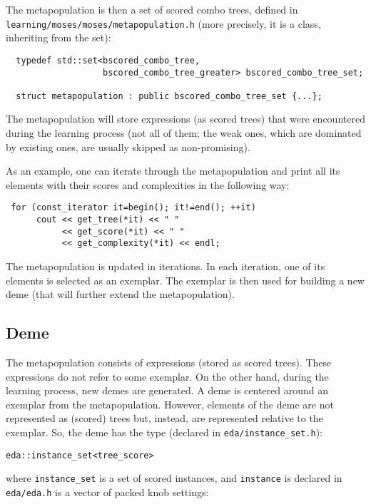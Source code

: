 \documentclass{article}
\begin{document}
The metapopulation is then a set of scored combo trees, defined in 
\verb|learning/moses/moses/metapopulation.h| (more precisely, it is a
class, inheriting from the set):

\begin{verbatim}
  typedef std::set<bscored_combo_tree,
                   bscored_combo_tree_greater> bscored_combo_tree_set;

  struct metapopulation : public bscored_combo_tree_set {...};
\end{verbatim}

The metapopulation will store expressions (as scored trees) that were
encountered during the learning process (not all of them; the weak
ones, which are dominated by existing ones, are usually skipped as
non-promising). 

As an example, one can iterate through the metapopulation and print 
all its elements with their scores and complexities in the following way:

\begin{verbatim}
 for (const_iterator it=begin(); it!=end(); ++it)
      cout << get_tree(*it) << " " 
           << get_score(*it) << " " 
           << get_complexity(*it) << endl;
\end{verbatim}

The metapopulation is updated in iterations. In each iteration, one 
of its elements is selected as an exemplar. The exemplar is then
used for building a new deme (that will further extend the
metapopulation).


\subsection{Deme}

The metapopulation consists of expressions (stored as scored trees).
These expressions do not refer to some exemplar. On the other hand,
during the learning process, new demes are generated. 
A deme is centered around an exemplar from the metapopulation. 
However, elements of the deme are not represented as (scored) trees
but, instead, are represented relative to the exemplar. 
So, the deme has the type (declared in \verb|eda/instance_set.h|): 

\begin{verbatim}
eda::instance_set<tree_score>
\end{verbatim}

\noindent
where \verb|instance_set| is a set of scored instances, and \verb|instance|
is declared in \verb|eda/eda.h| is a vector of packed knob settings: 
\end{document}
